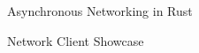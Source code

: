 \begin{frame}{Asynchronous Networking in Rust}
    \Huge
    \centerline{Network Client Showcase}
\end{frame}
